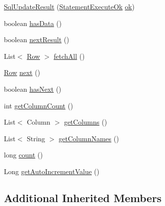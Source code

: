 \begin{DoxyCompactItemize}
\item 
\mbox{\hyperlink{classcom_1_1mysql_1_1cj_1_1xdevapi_1_1_sql_update_result_a944c2dd5a1d4b228cb06a50f75cd4b69}{Sql\+Update\+Result}} (\mbox{\hyperlink{classcom_1_1mysql_1_1cj_1_1protocol_1_1x_1_1_statement_execute_ok}{Statement\+Execute\+Ok}} \mbox{\hyperlink{classcom_1_1mysql_1_1cj_1_1xdevapi_1_1_update_result_a9314dbffc186019112194b43a86e0174}{ok}})
\item 
boolean \mbox{\hyperlink{classcom_1_1mysql_1_1cj_1_1xdevapi_1_1_sql_update_result_a38bebbec7e0b9049b0d7aef72d7856eb}{has\+Data}} ()
\item 
boolean \mbox{\hyperlink{classcom_1_1mysql_1_1cj_1_1xdevapi_1_1_sql_update_result_a3fad012f9b23f87f7aac62edd51c604a}{next\+Result}} ()
\item 
List$<$ \mbox{\hyperlink{interfacecom_1_1mysql_1_1cj_1_1result_1_1_row}{Row}} $>$ \mbox{\hyperlink{classcom_1_1mysql_1_1cj_1_1xdevapi_1_1_sql_update_result_a24d25920523726a869eaf72532264996}{fetch\+All}} ()
\item 
\mbox{\hyperlink{interfacecom_1_1mysql_1_1cj_1_1result_1_1_row}{Row}} \mbox{\hyperlink{classcom_1_1mysql_1_1cj_1_1xdevapi_1_1_sql_update_result_aa9e2be0f2c6b199766e01210295cdecd}{next}} ()
\item 
boolean \mbox{\hyperlink{classcom_1_1mysql_1_1cj_1_1xdevapi_1_1_sql_update_result_a88fe52667887b3930a61d864f08dda61}{has\+Next}} ()
\item 
int \mbox{\hyperlink{classcom_1_1mysql_1_1cj_1_1xdevapi_1_1_sql_update_result_a5b8a4cf3a36c9488feae9830562f4928}{get\+Column\+Count}} ()
\item 
List$<$ Column $>$ \mbox{\hyperlink{classcom_1_1mysql_1_1cj_1_1xdevapi_1_1_sql_update_result_a229524cce1f3a1157e52d8f3d7b9dfc1}{get\+Columns}} ()
\item 
List$<$ String $>$ \mbox{\hyperlink{classcom_1_1mysql_1_1cj_1_1xdevapi_1_1_sql_update_result_a46b0f0ea62ed9ed071f14eee6a4ff743}{get\+Column\+Names}} ()
\item 
long \mbox{\hyperlink{classcom_1_1mysql_1_1cj_1_1xdevapi_1_1_sql_update_result_af063f47ae67dd935bdb2898930578b68}{count}} ()
\item 
Long \mbox{\hyperlink{classcom_1_1mysql_1_1cj_1_1xdevapi_1_1_sql_update_result_a7c839bddddabb36231503575810e8a1d}{get\+Auto\+Increment\+Value}} ()
\end{DoxyCompactItemize}
\subsection*{Additional Inherited Members}


